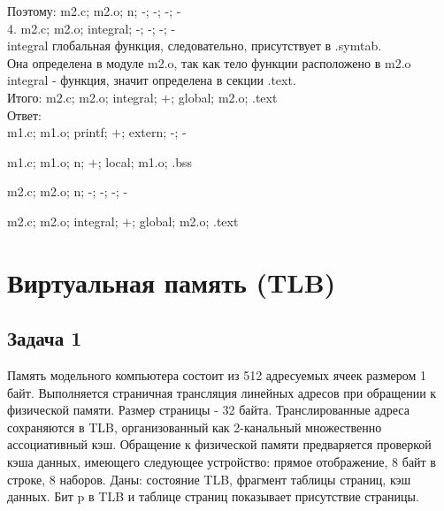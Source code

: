 \documentclass[12pt, letterpaper]{article}
\begin{document}
Поэтому: m2.c; m2.o; n; -; -; -; -\\

4. m2.c; m2.o; integral; -; -; -; -\\
integral глобальная функция, следовательно, присутствует в .symtab.\\
Она определена в модуле m2.o, так как тело функции расположено в m2.o\\
integral - функция, значит определена в секции .text.\\

Итого: m2.c; m2.o; integral; $+$; global; m2.o; .text\\

Ответ:\\

m1.c; m1.o; printf; $+$; extern; -; -

m1.c; m1.o; n; $+$; local; m1.o; .bss

m2.c; m2.o; n; -; -; -; -

m2.c; m2.o; integral; $+$; global; m2.o; .text\\
\newpage
\section{Виртуальная память (TLB)}
\subsection{Задача 1}
Память модельного компьютера состоит из 512 адресуемых ячеек размером 1 байт. Выполняется страничная трансляция линейных адресов при обращении к физической памяти. Размер страницы - 32 байта. Транслированные адреса сохраняются в TLB, организованный как 2-канальный множественно ассоциативный кэш. Обращение к физической памяти предваряется проверкой кэша данных, имеющего следующее устройство: прямое отображение, 8 байт в строке, 8 наборов. Даны: состояние TLB, фрагмент таблицы страниц, кэш данных. Бит p в TLB и таблице страниц показывает присутствие страницы.\\
\end{document}
